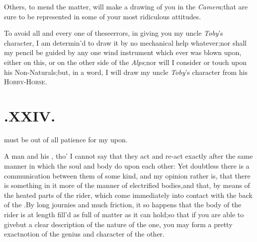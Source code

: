 \documentclass{article}
\begin{document}
Others, to mend the matter, will make a drawing of you in the
\textit{Camera};\tsk that\break
{}
are sure to be represented in some of your most
ridiculous attitudes.

To avoid all and every one of these\break errors, in giving you my
uncle \textit{Toby}’s character, I am determin’d to draw it
by
no mechanical help whatever;\tsh nor shall my pencil be guided by
any one wind instrument which ever was blown upon, either on this,
or on the other side of the \textit{Alps};\tsk nor will I
consider\break
{}
or touch upon his
Non-Naturals;\tsk but, in a word, I will draw my uncle
\textit{Toby}’s character from his
\textsc{Hobby-Horse}.


\null
\section{.\enspace XXIV.}

  must be out of all patience for my\break
{}
\break 
upon.

A man and his ,\break
tho’ I cannot say that they act and re-act exactly after the
same manner in which the soul and body do upon each other: Yet
doubtless there is a communication between them of some kind, and
my\break
opinion rather is, that there is something in it more of the
manner of electrified bodies,\tsk and that, by means of the
heated parts of the rider, which come immediately into contact with
the back of the .\tsk By
long journies and much friction, it so happens that the bo\-dy of
the rider is at length fill’d as full of
 matter as it can
hold;\tsk so that if you are able to give\break but a clear description of the nature
of the one, you may form a pretty exact\break notion of the genius and
character of the other.
\end{document}
